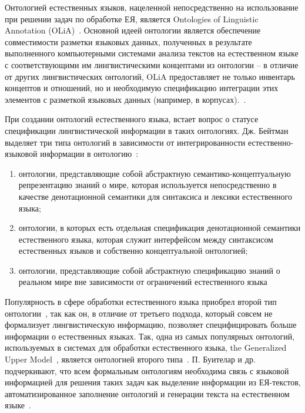 Онтологией естественных языков, нацеленной непосредственно на использование при решении задач по обработке ЕЯ, является Ontologies of Linguistic Annotation (OLiA)~\cite{chiarcos-2012-ontologies}.
Основной идеей онтологии является обеспечение совместимости разметки языковых данных, полученных в результате выполненного компьютерными системами анализа текстов на естественном языке с соответствующими им лингвистическими концептами из онтологии -- в отличие от других лингвистических онтологий, OLiA предоставляет не только инвентарь концептов и отношений, но и необходимую спецификацию интеграции этих элементов с разметкой языковых данных (например, в корпусах).~\cite[p.~4]{chiarcos-2012-ontologies}.

При создании онтологий естественного языка, встает вопрос о статусе спецификации лингвистической информации в таких онтологиях.
Дж. Бейтман выделяет три типа онтологий в зависимости от интегрированности естественно-языковой информации в онтологию~\cite{Bateman_1997}:
\begin{enumerate}
    \item онтологии, представляющие собой абстрактную семантико-концептуальную репрезентацию знаний о мире, которая используется непосредственно в качестве денотационной семантики для синтаксиса и лексики естественного языка;
    \item онтологии, в которых есть отдельная спецификация денотационной семантики естественного языка, которая служит интерфейсом между синтаксисом естественных языков и собственно концептуальной онтологией;
    \item онтологии, представляющие собой абстрактную спецификацию знаний о реальном мире вне зависимости от ограничений естественного языка
\end{enumerate}

Популярность в сфере обработки естественного языка приобрел второй тип онтологии~\cite[p.~8]{Bateman_1997}, так как он, в отличие от третьего подхода, который совсем не формализует лингвистическую информацию, позволяет специфицировать больше информации о естественных языках.
Так, одна из самых популярных онтологий, используемых в системах для обработки естественного языка, the Generalized Upper Model~\cite{Bateman2002TheGU}, является онтологией второго типа~\cite{Bateman_1997}.
П.
Буителар и др.
подчеркивают, что всем формальным онтологиям необходима связь с языковой информацией для решения таких задач как выделение информации из ЕЯ-текстов, автоматизированное заполнение онтологий и генерации текста на естественном языке~\cite{Buitelaar_2009}.

